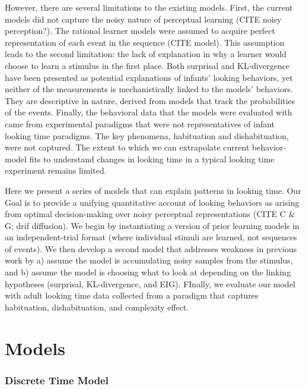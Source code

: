\documentclass[10pt, letterpaper]{article}
\begin{document}
However, there are several limitations to the existing models. First, the current models did not capture the noisy nature of perceptual learning (CITE noisy perception?). The rational learner models were assumed to acquire perfect representation of each event in the sequence (CITE model). This assumption leads to the second limitation: the lack of explanation in why a learner would choose to learn a stimulus in the first place. Both surprisal and KL-divergence have been presented as potential explanations of infants' looking behaviors, yet neither of the measurements is mechanistically linked to the models' behaviors. They are descriptive in nature, derived from models that track the probabilities of the events. Finally, the behavioral data that the models were evaluated with came from experimental paradigms that were not representatives of infant looking time paradigms. The key phenomena, habituation and dishabituation, were not captured. The extent to which we can extrapolate current behavior-model fits to understand changes in looking time in a typical looking time experiment remains limited.

Here we present a series of models that can explain patterns in looking time. Our Goal is to provide a unifying quantitative account of looking behaviors as arising from optimal decision-making over noisy perceptual representations (CITE C \& G; drif diffusion). We begin by instantiating a version of prior learning models in an independent-trial format (where individual stimuli are learned, not sequences of events). We then develop a second model that addresses weakness in previous work by a) assume the model is accumulating noisy samples from the stimulus, and b) assume the model is choosing what to look at depending on the linking hypotheses (surprisal, KL-divergence, and EIG). FInally, we evaluate our model with adult looking time data collected from a paradigm that captures habituation, dishabituation, and complexity effect.

\hypertarget{models}{%
\section{Models}\label{models}}

\hypertarget{discrete-time-model}{%
\subsubsection{Discrete Time Model}\label{discrete-time-model}}
\end{document}
